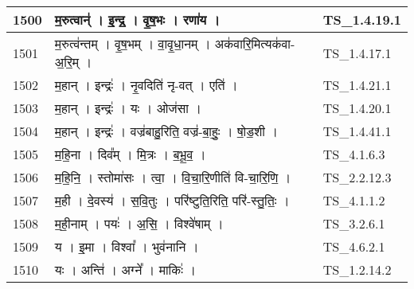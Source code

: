 \documentclass[17pt]{extarticle}
\begin{document}
\begin{longtable}{||p{0.4in}||p{4.9in}||p{0.9in}||}
    \hline
        
    1500 & म॒रुत्वान्॑   ।   इ॒न्द्र॒   ।   वृ॒ष॒भः   ।   रणा॑य   ।    & TS\_1.4.19.1       \\
    
    \hline
        
    1501 & म॒रुत्व॑न्तम्   ।   वृ॒ष॒भम्   ।   वा॒वृ॒धा॒नम्   ।   अक॑वारि॒मित्यक॑वा{-}अ॒रि॒म्   ।    & TS\_1.4.17.1       \\
    
    \hline
        
    1502 & म॒हान्   ।   इन्द्रः॑   ।   नृ॒वदिति॑ नृ{-}वत्   ।   एति॑   ।    & TS\_1.4.21.1       \\
    
    \hline
        
    1503 & म॒हान्   ।   इन्द्रः॑   ।   यः   ।   ओज॑सा   ।    & TS\_1.4.20.1       \\
    
    \hline
        
    1504 & म॒हान्   ।   इन्द्रः॑   ।   वज्र॑बाहु॒रिति॒ वज्र॑{-}बा॒हुः॒   ।   षो॒ड॒शी   ।    & TS\_1.4.41.1       \\
    
    \hline
        
    1505 & म॒हि॒ना   ।   दिव᳚म्   ।   मि॒त्रः   ।   ब॒भू॒व॒   ।    & TS\_4.1.6.3       \\
    
    \hline
        
    1506 & म॒हि॒नि॒   ।   स्तोमा॑सः   ।   त्वा॒   ।   वि॒चा॒रि॒णीति॑ वि{-}चा॒रि॒णि॒   ।    & TS\_2.2.12.3       \\
    
    \hline
        
    1507 & म॒ही   ।   दे॒वस्य॑   ।   स॒वि॒तुः   ।   परि॑ष्टुति॒रिति॒ परि॑{-}स्तु॒तिः॒   ।    & TS\_4.1.1.2       \\
    
    \hline
        
    1508 & म॒ही॒नाम्   ।   पयः॑   ।   अ॒सि॒   ।   विश्वे॑षाम्   ।    & TS\_3.2.6.1       \\
    
    \hline
        
    1509 & य   ।   इ॒मा   ।   विश्वा᳚   ।   भुव॑नानि   ।    & TS\_4.6.2.1       \\
    
    \hline
        
    1510 & यः   ।   अन्ति॑   ।   अग्ने᳚   ।   माकिः॑   ।    & TS\_1.2.14.2       \\
    

\end{longtable}
\end{document}
